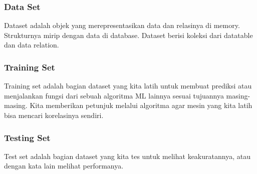 \subsubsection{Data Set}
\hfill\break
Dataset adalah objek yang merepresentasikan data dan relasinya di memory. Strukturnya mirip dengan data di database. Dataset berisi koleksi dari datatable dan data relation.
\subsubsection{Training Set}
\hfill\break
Training set adalah bagian dataset yang kita latih untuk membuat prediksi atau menjalankan fungsi dari sebuah algoritma ML lainnya sesuai tujuannya masing-masing. Kita memberikan petunjuk melalui algoritma agar mesin yang kita latih bisa mencari korelasinya sendiri. 
\subsubsection{Testing Set}
\hfill\break
Test set adalah bagian dataset yang kita tes untuk melihat keakuratannya, atau dengan kata lain melihat performanya.


